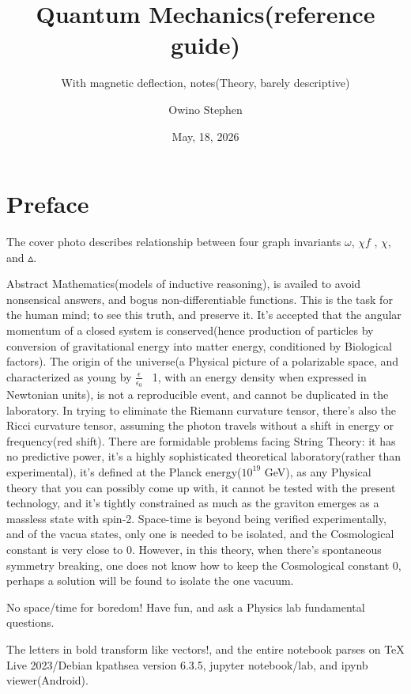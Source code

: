 \documentclass[10pt,fancy]{elegantbook}
\title{Quantum Mechanics(reference guide)}
\subtitle{With magnetic deflection, notes(Theory, barely descriptive)}
\author{Owino Stephen}
\institute{\copyright \the\year{} This book was typeset using \LaTeX{} Program}
\date{May, 18, 2026}
\begin{document}
\setcounter{tocdepth}{4}
\mbox{}

\maketitle

\frontmatter
\tableofcontents

\mainmatter
\section{Preface}


The cover photo describes relationship between four graph invariants $\omega$, $\chi f$ , $\chi$, and $\vartriangle$.


Abstract Mathematics(models of inductive reasoning), is availed to avoid nonsensical answers, and bogus non-differentiable functions. This is the task for the human mind; to see this truth, and preserve it.
It's accepted that the angular momentum of a closed system is conserved(hence production of particles by conversion of gravitational energy into matter energy, conditioned by Biological factors). The origin of the universe(a Physical picture of a polarizable space, and characterized as young by $\frac{\epsilon} {\epsilon_0}$ ~1, with an energy density when expressed in Newtonian units), is not a reproducible event, and cannot be duplicated in the laboratory. In trying to eliminate the Riemann curvature tensor, there's also the Ricci curvature tensor, assuming the photon travels without a shift in energy or frequency(red shift). There are formidable problems facing String Theory: it has no predictive power, it's a highly sophisticated theoretical laboratory(rather than experimental), it's defined at the Planck energy($10^{19}$ GeV), as any Physical theory that you can possibly come up with, it cannot be tested with the present technology, and it's tightly constrained as much as the graviton emerges as a massless state with spin-2.
Space-time is beyond being verified experimentally, and of the vacua states, only one is needed to be isolated, and the  Cosmological constant is very close to 0. However, in this theory, when there's spontaneous symmetry breaking, one does not know how to keep the Cosmological constant 0, perhaps a solution will be found to isolate the one vacuum.

No space/time for boredom! Have fun, and ask a Physics lab fundamental questions.  

The letters in bold transform like vectors!, and the entire notebook parses on TeX Live 2023/Debian kpathsea version 6.3.5,
jupyter notebook/lab, and ipynb viewer(Android).  
\end{document}
